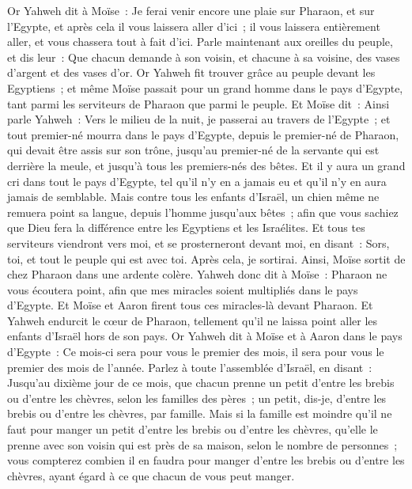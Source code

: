 \begin{multicols}{2}
\VerseOne{}Or Yahweh dit à Moïse~: Je ferai venir encore une plaie sur Pharaon, et sur l'Egypte, et après cela il vous laissera aller d'ici~; il vous laissera entièrement aller, et vous chassera tout à fait d'ici.
Parle maintenant aux oreilles du peuple, et dis leur~: Que chacun demande à son voisin, et chacune à sa voisine, des vases d'argent et des vases d'or.
Or Yahweh fit trouver grâce au peuple devant les Egyptiens~; et même Moïse passait pour un grand homme dans le pays d'Egypte, tant parmi les serviteurs de Pharaon que parmi le peuple.
Et Moïse dit~: Ainsi parle Yahweh~: Vers le milieu de la nuit, je passerai au travers de l'Egypte~;
et tout premier-né mourra dans le pays d'Egypte, depuis le premier-né de Pharaon, qui devait être assis sur son trône, jusqu'au premier-né de la servante qui est derrière la meule, et jusqu'à tous les premiers-nés des bêtes.
Et il y aura un grand cri dans tout le pays d'Egypte, tel qu'il n'y en a jamais eu et qu'il n'y en aura jamais de semblable.
Mais contre tous les enfants d'Israël, un chien même ne remuera point sa langue, depuis l'homme jusqu'aux bêtes~; afin que vous sachiez que Dieu fera la différence entre les Egyptiens et les Israélites.
Et tous tes serviteurs viendront vers moi, et se prosterneront devant moi, en disant~: Sors, toi, et tout le peuple qui est avec toi. Après cela, je sortirai. Ainsi, Moïse sortit de chez Pharaon dans une ardente colère.
Yahweh donc dit à Moïse~: Pharaon ne vous écoutera point, afin que mes miracles soient multipliés dans le pays d'Egypte.
Et Moïse et Aaron firent tous ces miracles-là devant Pharaon. Et Yahweh endurcit le cœur de Pharaon, tellement qu'il ne laissa point aller les enfants d'Israël hors de son pays.
\VerseOne{}Or Yahweh dit à Moïse et à Aaron dans le pays d'Egypte~:
Ce mois-ci sera pour vous le premier des mois, il sera pour vous le premier des mois de l'année.
Parlez à toute l'assemblée d'Israël, en disant~: Jusqu'au dixième jour de ce mois, que chacun prenne un petit d'entre les brebis ou d'entre les chèvres, selon les familles des pères~; un petit, dis-je, d'entre les brebis ou d'entre les chèvres, par famille.
Mais si la famille est moindre qu'il ne faut pour manger un petit d'entre les brebis ou d'entre les chèvres, qu'elle le prenne avec son voisin qui est près de sa maison, selon le nombre de personnes~; vous compterez combien il en faudra pour manger d'entre les brebis ou d'entre les chèvres, ayant égard à ce que chacun de vous peut manger.

\end{multicols}
